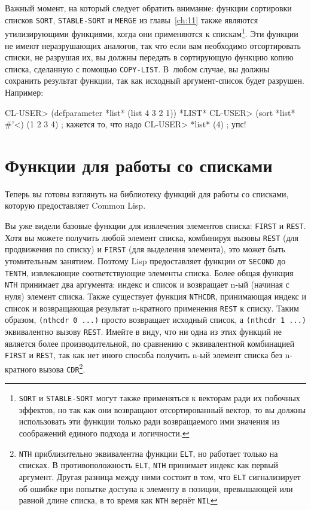 Важный момент, на который следует обратить внимание: функции сортировки списков
\lstinline{SORT}, \lstinline{STABLE-SORT} и \lstinline{MERGE} из главы~\ref{ch:11} также являются
утилизирующими функциями, когда они применяются к спискам\footnote{\lstinline{SORT} и
  \lstinline{STABLE-SORT} могут также применяться к векторам ради их побочных эффектов, но
  так как они возвращают отсортированный вектор, то вы должны использовать эти функции только
  ради возвращаемого ими значения из соображений единого подхода и логичности.}\hspace{\footnotenegspace}. Эти
функции не имеют неразрушающих аналогов, так что если вам необходимо отсортировать списки,
не разрушая их, вы должны передать в сортирующую функцию копию списка, сделанную с помощью
\lstinline{COPY-LIST}. В~любом случае, вы должны сохранить результат функции, так как исходный
аргумент-список будет разрушен. Например:

\begin{myverb}
CL-USER> (defparameter *list* (list 4 3 2 1))
*LIST*
CL-USER> (sort *list* #'<)
(1 2 3 4)                      ; кажется то, что надо
CL-USER> *list*
(4)                            ; упс!
\end{myverb}

\section{Функции для работы со списками}
\label{sec:12-list-funcs}

Теперь вы готовы взглянуть на библиотеку функций для работы со списками, которую
предоставляет Common Lisp.

Вы уже видели базовые функции для извлечения элементов списка: \lstinline{FIRST} и
\lstinline{REST}. Хотя вы можете получить любой элемент списка, комбинируя вызовы \lstinline{REST}
(для продвижения по списку) и \lstinline{FIRST} (для выделения элемента), это может быть
утомительным занятием. Поэтому Lisp предоставляет функции от \lstinline{SECOND} до \lstinline{TENTH},
извлекающие соответствующие элементы списка. Более общая функция \lstinline{NTH} принимает два
аргумента: индекс и список и возвращает n-ый (начиная с нуля) элемент списка. Также
существует функция \lstinline{NTHCDR}, принимающая индекс и список и возвращающая результат
n-кратного применения \lstinline{REST} к списку. Таким образом, \lstinline{(nthcdr 0 ...)}  просто
возвращает исходный список, а \lstinline{(nthcdr 1 ...)}  эквивалентно вызову
\lstinline{REST}. Имейте в виду, что ни одна из этих функций не является более производительной,
по сравнению с эквивалентной комбинацией \lstinline{FIRST} и \lstinline{REST}, так как нет иного
способа получить n-ый элемент списка без n-кратного вызова \lstinline{CDR}\footnote{\lstinline{NTH}
  приблизительно эквивалентна функции \lstinline{ELT}, но работает только на списках. В
  противоположность \lstinline{ELT}, \lstinline{NTH} принимает индекс как первый аргумент. Другая
  разница между ними состоит в том, что \lstinline{ELT} сигнализирует об ошибке при попытке
  доступа к элементу в позиции, превышающей или равной длине списка, в то время как
  \lstinline{NTH} вернёт \lstinline{NIL}}\hspace{\footnotenegspace}.

